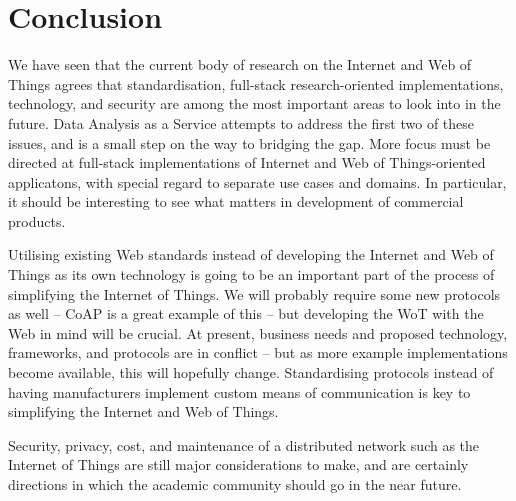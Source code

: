 \section{Conclusion}
We have seen that the current body of research on the Internet and Web of Things agrees that standardisation, full-stack research-oriented implementations, technology, and security are among the most important areas to look into in the future. Data Analysis as a Service attempts to address the first two of these issues, and is a small step on the way to bridging the gap. More focus must be directed at full-stack implementations of Internet and Web of Things-oriented applicatons, with special regard to separate use cases and domains. In particular, it should be interesting to see what matters in development of commercial products. 

Utilising existing Web standards instead of developing the Internet and Web of Things as its own technology is going to be an important part of the process of simplifying the Internet of Things. We will probably require some new protocols as well -- CoAP is a great example of this -- but developing the WoT with the Web in mind will be crucial. At present, business needs and proposed technology, frameworks, and protocols are in conflict -- but as more example implementations become available, this will hopefully change. Standardising protocols instead of having manufacturers implement custom means of communication is key to simplifying the Internet and Web of Things.

Security, privacy, cost, and maintenance of a distributed network such as the Internet of Things are still major considerations to make, and are certainly directions in which the academic community should go in the near future.
